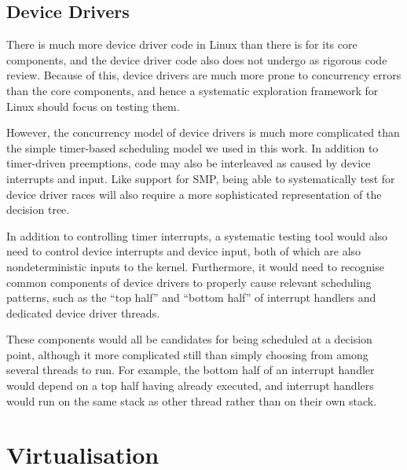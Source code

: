 \subsection{Device Drivers}
\label{sec:future-drivers}

There is much more device driver code in Linux than there is for its core components, and the device driver code also does not undergo as rigorous code review. Because of this, device drivers are much more prone to concurrency errors than the core components, and hence a systematic exploration framework for Linux should focus on testing them.

However, the concurrency model of device drivers is much more complicated than the simple timer-based scheduling model we used in this work. In addition to timer-driven preemptions, code may also be interleaved as caused by device interrupts and input. Like support for SMP, being able to systematically test for device driver races will also require a more sophisticated representation of the decision tree.

In addition to controlling timer interrupts, a systematic testing tool would also need to control device interrupts and device input, both of which are also nondeterministic inputs to the kernel. Furthermore, it would need to recognise common components of device drivers to properly cause relevant scheduling patterns, such as the ``top half'' and ``bottom half'' of interrupt handlers and dedicated device driver threads.

These components would all be candidates for being scheduled at a decision point, although it more complicated still than simply choosing from among several threads to run. For example, the bottom half of an interrupt handler would depend on a top half having already executed, and interrupt handlers would run on the same stack as other thread rather than on their own stack.



\section{Virtualisation}
\label{sec:future-virt}

